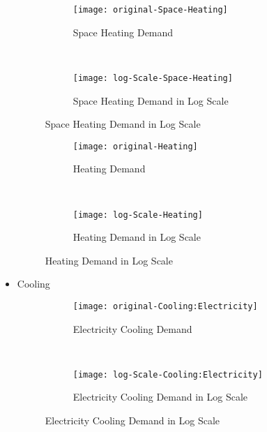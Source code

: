 \begin{itemize}
\begin{figure}[h!]
  \centering
  \begin{subfigure}{0.4\textwidth}
  \centering
  \texttt{[image: original-Space-Heating]}
  \caption[Space Heating Demand]{Space Heating Demand}
  \label{fig:original-Space-Heating}
\end{subfigure}
~
\begin{subfigure}{0.4\textwidth}
  \centering
  \texttt{[image: log-Scale-Space-Heating]}
  \caption[Space Heating Demand]{Space Heating Demand in Log Scale}
  \label{fig:log-Scale-Space-Heating}
\end{subfigure}
  \caption[Space Heating Demand Log]{Space Heating Demand in Log Scale}
\end{figure}

\begin{figure}[h!]
  \centering
  \begin{subfigure}{0.4\textwidth}
  \centering
  \texttt{[image: original-Heating]}
  \caption[Heating Demand]{Heating Demand}
  \label{fig:original-Heating}
\end{subfigure}
~
\begin{subfigure}{0.4\textwidth}
  \centering
  \texttt{[image: log-Scale-Heating]}
  \caption[Heating Demand]{Heating Demand in Log Scale}
  \label{fig:log-Scale-Heating}
\end{subfigure}
  \caption[Heating Demand Log]{Heating Demand in Log Scale}
\end{figure}

\pagebreak
\item Cooling

\begin{figure}[h!]
  \centering
  \begin{subfigure}{0.4\textwidth}
  \centering
  \texttt{[image: original-Cooling:Electricity]}
  \caption[Electricity Cooling Demand]{Electricity Cooling Demand}
  \label{fig:original-Cooling:Electricity}
\end{subfigure}
~
\begin{subfigure}{0.4\textwidth}
  \centering
  \texttt{[image: log-Scale-Cooling:Electricity]}
  \caption[Electricity Cooling Demand]{Electricity Cooling Demand in Log Scale}
  \label{fig:log-Scale-Cooling:Electricity}
\end{subfigure}
  \caption[Electricity Cooling Demand Log]{Electricity Cooling Demand in Log Scale}
\end{figure}


\end{itemize}
